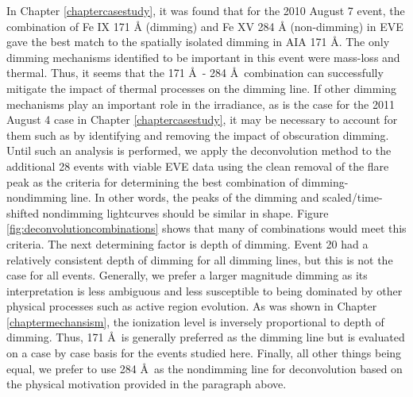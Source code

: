 In Chapter \ref{chaptercasestudy}, it was found that for the 2010 August 7 event, the combination of Fe IX 171 Å (dimming) and Fe XV 284 Å (non-dimming) in EVE gave the best match to the spatially isolated dimming in AIA 171 \AA. The only dimming mechanisms identified to be important in this event were mass-loss and thermal. Thus, it seems that the 171 \AA\ - 284 \AA\ combination can successfully mitigate the impact of thermal processes on the dimming line. If other dimming mechanisms play an important role in the irradiance, as is the case for the 2011 August 4 case in Chapter \ref{chaptercasestudy}, it may be necessary to account for them such as by identifying and removing the impact of obscuration dimming. Until such an analysis is performed, we apply the deconvolution method to the additional 28 events with viable EVE data using the clean removal of the flare peak as the criteria for determining the best combination of dimming-nondimming line. In other words, the peaks of the dimming and scaled/time-shifted nondimming lightcurves should be similar in shape. Figure \ref{fig:deconvolutioncombinations} shows that many of combinations would meet this criteria. The next determining factor is depth of dimming. Event 20 had a relatively consistent depth of dimming for all dimming lines, but this is not the case for all events. Generally, we prefer a larger magnitude dimming as its interpretation is less ambiguous and less susceptible to being dominated by other physical processes such as active region evolution. As was shown in Chapter \ref{chaptermechansism}, the ionization level is inversely proportional to depth of dimming. Thus, 171 \AA\ is generally preferred as the dimming line but is evaluated on a case by case basis for the events studied here. Finally, all other things being equal, we prefer to use 284 \AA\ as the nondimming line for deconvolution based on the physical motivation provided in the paragraph above. 

